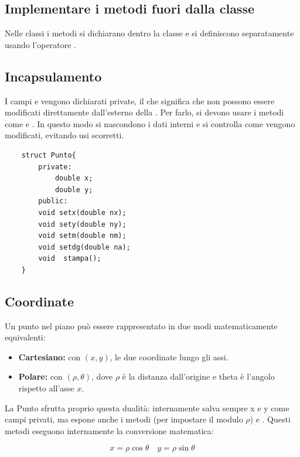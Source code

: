 \subsection{Implementare i metodi fuori dalla classe}
Nelle classi i metodi si dichiarano dentro la classe e si definiscono separatamente usando l'operatore \inlinecode{::}. 

\subsection{Incapsulamento}
 I campi  e  vengono dichiarati private, il che significa che non possono essere modificati direttamente dall'esterno della . Per farlo, si devono usare i metodi  come e . In questo modo si nascondono i dati interni e si controlla come vengono modificati, evitando usi scorretti.

\begin{codebox}
    \begin{lstlisting}
    struct Punto{
        private:
            double x;
            double y;
        public:
        void setx(double nx);
        void sety(double ny);
        void setm(double nm);
        void setdg(double na);
        void  stampa();
    }
    \end{lstlisting}
\end{codebox}

\subsection{Coordinate}
Un punto nel piano può essere rappresentato in due modi matematicamente equivalenti:
\begin{itemize}
    \item \textbf{Cartesiano:} con $(x,y)$, le due coordinate lungo gli assi.
    \item \textbf{Polare:} con $(\rho,\theta)$, dove $\rho$ è la distanza dall'origine e theta è l'angolo rispetto all'asse $x$.
\end{itemize}
La  Punto sfrutta proprio questa dualità: internamente salva sempre x e y come campi privati, ma espone anche i metodi  (per impostare il modulo $\rho$) e . Questi metodi eseguono internamente la conversione matematica:

\[
    x = \rho \cos \theta \quad y= \rho \sin \theta
\]

